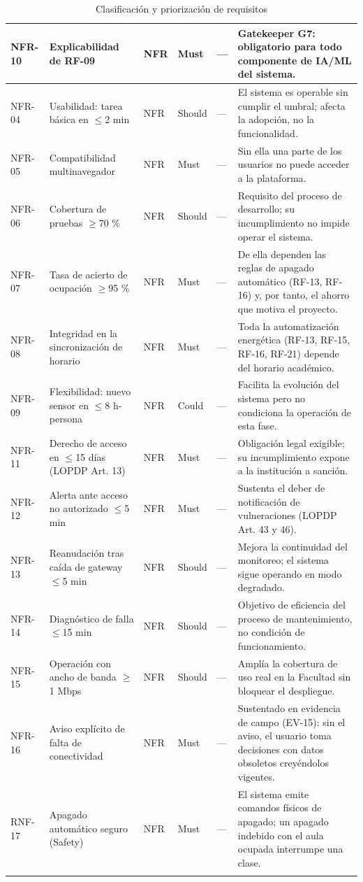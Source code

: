 \begin{longtable}{|p{2.6cm}|p{2.6cm}|p{2.6cm}|p{2.6cm}|p{2.6cm}|p{2.6cm}|}
NFR-10 & Explicabilidad de RF-09 & NFR & Must & --- & Gatekeeper G7: obligatorio para todo componente de IA/ML del sistema. \\ \hline
NFR-04 & Usabilidad: tarea básica en $\leq$2 min & NFR & Should & --- & El sistema es operable sin cumplir el umbral; afecta la adopción, no la funcionalidad. \\ \hline
NFR-05 & Compatibilidad multinavegador & NFR & Must & --- & Sin ella una parte de los usuarios no puede acceder a la plataforma. \\ \hline
NFR-06 & Cobertura de pruebas $\geq$70 \% & NFR & Should & --- & Requisito del proceso de desarrollo; su incumplimiento no impide operar el sistema. \\ \hline
NFR-07 & Tasa de acierto de ocupación $\geq$95 \% & NFR & Must & --- & De ella dependen las reglas de apagado automático (RF-13, RF-16) y, por tanto, el ahorro que motiva el proyecto. \\ \hline
NFR-08 & Integridad en la sincronización de horario & NFR & Must & --- & Toda la automatización energética (RF-13, RF-15, RF-16, RF-21) depende del horario académico. \\ \hline
NFR-09 & Flexibilidad: nuevo sensor en $\leq$8 h-persona & NFR & Could & --- & Facilita la evolución del sistema pero no condiciona la operación de esta fase. \\ \hline
NFR-11 & Derecho de acceso en $\leq$15 días (LOPDP Art. 13) & NFR & Must & --- & Obligación legal exigible; su incumplimiento expone a la institución a sanción. \\ \hline
NFR-12 & Alerta ante acceso no autorizado $\leq$5 min & NFR & Must & --- & Sustenta el deber de notificación de vulneraciones (LOPDP Art. 43 y 46). \\ \hline
NFR-13 & Reanudación tras caída de gateway $\leq$5 min & NFR & Should & --- & Mejora la continuidad del monitoreo; el sistema sigue operando en modo degradado. \\ \hline
NFR-14 & Diagnóstico de falla $\leq$15 min & NFR & Should & --- & Objetivo de eficiencia del proceso de mantenimiento, no condición de funcionamiento. \\ \hline
NFR-15 & Operación con ancho de banda $\geq$1 Mbps & NFR & Should & --- & Amplía la cobertura de uso real en la Facultad sin bloquear el despliegue. \\ \hline
NFR-16 & Aviso explícito de falta de conectividad & NFR & Must & --- & Sustentado en evidencia de campo (EV-15): sin el aviso, el usuario toma decisiones con datos obsoletos creyéndolos vigentes. \\ \hline
RNF-17 & Apagado automático seguro (Safety) & NFR & Must & --- & El sistema emite comandos físicos de apagado; un apagado indebido con el aula ocupada interrumpe una clase. \\ \hline
\caption{Clasificación y priorización de requisitos}
\end{longtable}
\endgroup

